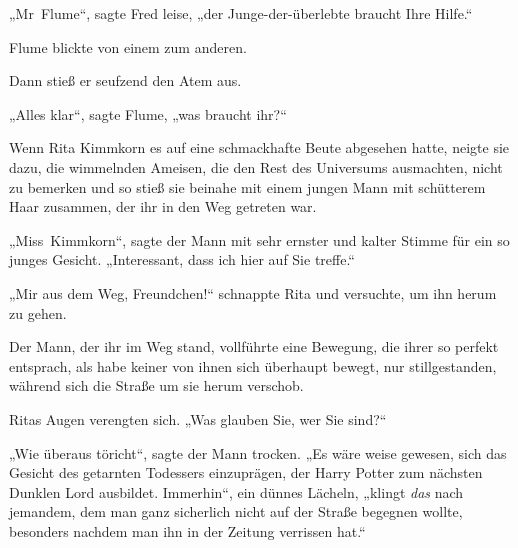 „Mr~Flume“, sagte Fred leise, „der Junge-der-überlebte braucht Ihre Hilfe.“

Flume blickte von einem zum anderen.

Dann stieß er seufzend den Atem aus.

„Alles klar“, sagte Flume, „was braucht ihr?“


Wenn Rita Kimmkorn es auf eine schmackhafte Beute abgesehen hatte, neigte sie dazu, die wimmelnden Ameisen, die den Rest des Universums ausmachten, nicht zu bemerken und so stieß sie beinahe mit einem jungen Mann mit schütterem Haar zusammen, der ihr in den Weg getreten war.

„Miss~Kimmkorn“, sagte der Mann mit sehr ernster und kalter Stimme für ein so junges Gesicht.
„Interessant, dass ich hier auf Sie treffe.“

„Mir aus dem Weg, Freundchen!“ schnappte Rita und versuchte, um ihn herum zu gehen.

Der Mann, der ihr im Weg stand, vollführte eine Bewegung, die ihrer so perfekt entsprach, als habe keiner von ihnen sich überhaupt bewegt, nur stillgestanden, während sich die Straße um sie herum verschob.

Ritas Augen verengten sich.
„Was glauben Sie, wer Sie sind?“

„Wie überaus töricht“, sagte der Mann trocken.
„Es wäre weise gewesen, sich das Gesicht des getarnten Todessers einzuprägen, der Harry Potter zum nächsten Dunklen Lord ausbildet. Immerhin“, ein dünnes Lächeln, „klingt \emph{das} nach jemandem, dem man ganz sicherlich nicht auf der Straße begegnen wollte, besonders nachdem man ihn in der Zeitung verrissen hat.“


